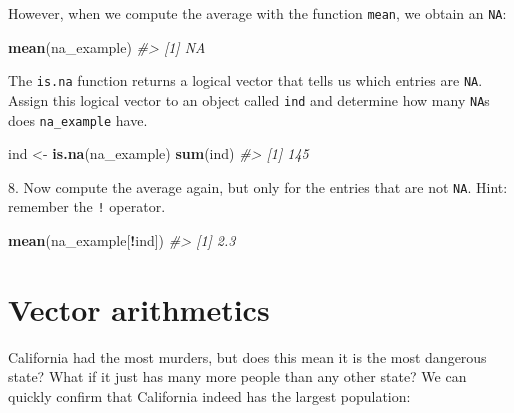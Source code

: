 \documentclass[
]{krantz}
\newenvironment{Shaded}{\begin{snugshade}}{\end{snugshade}}
\newcommand{\CommentTok}[1]{\textcolor[rgb]{0.37,0.37,0.37}{\textit{#1}}}
\newcommand{\KeywordTok}[1]{\textcolor[rgb]{0.27,0.27,0.27}{\textbf{#1}}}
\newcommand{\NormalTok}[1]{#1}
\newcommand{\OperatorTok}[1]{\textcolor[rgb]{0.43,0.43,0.43}{\textbf{#1}}}
\newcommand{\StringTok}[1]{\textcolor[rgb]{0.5,0.5,0.5}{#1}}
\begin{document}
However, when we compute the average with the function \texttt{mean}, we obtain an \texttt{NA}:

\begin{Shaded}
\begin{Highlighting}[]
\KeywordTok{mean}\NormalTok{(na_example)}
\CommentTok{#> [1] NA}
\end{Highlighting}
\end{Shaded}

The \texttt{is.na} function returns a logical vector that tells us which entries are \texttt{NA}. Assign this logical vector to an object called \texttt{ind} and determine how many \texttt{NA}s does \texttt{na\_example} have.

\begin{Shaded}
\begin{Highlighting}[]
\NormalTok{ind <-}\StringTok{ }\KeywordTok{is.na}\NormalTok{(na_example)}
\KeywordTok{sum}\NormalTok{(ind)}
\CommentTok{#> [1] 145}
\end{Highlighting}
\end{Shaded}

8. Now compute the average again, but only for the entries that are not \texttt{NA}. Hint: remember the \texttt{!} operator.

\begin{Shaded}
\begin{Highlighting}[]
\KeywordTok{mean}\NormalTok{(na_example[}\OperatorTok{!}\NormalTok{ind])}
\CommentTok{#> [1] 2.3}
\end{Highlighting}
\end{Shaded}

\hypertarget{vector-arithmetics}{%
\section{Vector arithmetics}\label{vector-arithmetics}}

California had the most murders, but does this mean it is the most dangerous state? What if it just has many more people than any other state? We can quickly confirm that California indeed has the largest population:

\begin{Shaded}
\end{Shaded}
\end{document}
